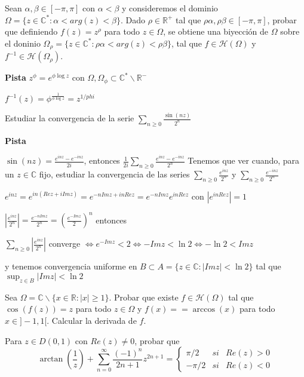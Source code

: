 \begin{ejer}
	Sean $\alpha,\beta\in [-\pi,\pi]$ con $\alpha < \beta$ y consideremos el dominio $\Omega = \{ z\in\mathbb{C}^{\ast} : \alpha < arg(z) < \beta \}$. Dado $\rho\in\mathbb{R}^+$ tal que $\rho\alpha,\rho\beta\in[-\pi,\pi]$, probar que definiendo $f(z) = z^{\rho}$ para todo $z\in\Omega$, se obtiene una biyección de $\Omega$ sobre el doninio $\Omega_{\rho} = \{ z\in\mathbb{C}^{\ast} : \rho\alpha < arg(z) < \rho\beta \}$, tal que $f\in\mathcal{H}(\Omega)$ y $f^{-1}\in\mathcal{H}(\Omega_{\rho})$.
\end{ejer}
\textbf{Pista}
$z^{\phi} = e^{ \phi \log z}$ con $\Omega,\Omega_{\phi} \subset \mathbb{C}^{\ast}\backslash \mathbb{R^-}$

$f^{-1}(z) = \phi^{\frac{1}{\phi\log z}} = z^{1/{phi}}$


\begin{ejer}
	Estudiar la convergencia de la serie $\sum_{n\geq 0} \frac{\sin(nz)}{2^n}$
\end{ejer}
\textbf{Pista}

$\sin(nz) = \frac{e^{inz}-e^{-inz}}{2i}$, entonces
$\frac{1}{2i} \sum_{n\geq 0} \frac{e^{inz}-e^{-inz}}{2^n}$
Tenemos que ver cuando, para un $z\in\mathbb{C}$ fijo, estudiar la convergencia de las series
$\sum_{n\geq 0} \frac{e^{inz}}{2^n}$ y $\sum_{n\geq 0} \frac{e^{-inz}}{2^n}$

$e^{inz} = e^{in(Rez+iImz)} = e^{-nImz+inRez} = e^{-nImz}e^{inRez}$ con $|e^{inRez}|=1$

$|\frac{e^{inz}}{2^n}| = \frac{e^{-nImz}}{2^n} = (\frac{e^{-Imz}}{2})^n$
entonces

$\sum_{n\geq 0} |\frac{e^{inz}}{2^n}|$ converge $\Longleftrightarrow e^{-Imz} < 2 \Longleftrightarrow -Imz < \ln 2 \Longleftrightarrow -\ln 2 < Imz$

y tenemos convergencia uniforme en $B\subset A= \{ z\in\mathbb{C} : |Imz|<\ln 2 \}$ tal que $\sup_{z\in B} |Imz| < \ln 2$


\begin{ejer}
	Sea $\Omega = \mathbb{C}\backslash\{ x\in\mathbb{R} : |x|\geq 1 \}$. Probar que existe $f\in\mathcal{H}(\Omega)$ tal que $\cos(f(z)) = z$ para todo $z\in\Omega$ y $f(x)==\arccos(x)$ para todo $x\in]-1,1[$. Calcular la derivada de $f$.
\end{ejer}


\begin{ejer}
	Para $z\in D(0,1)$ con $Re(z) \not =0$, probar que
	$$ \arctan\left(\frac{1}{z}\right) + \sum_{n=0}^{\infty} \frac{(-1)^n}{2n+1}z^{2n+1} = \left\{ \begin{array}{lcc}
	\pi/2  &   si  & Re(z)>0 \\
	-\pi/2 &  si & Re(z)<0 \end{array}
	\right. $$
\end{ejer}
